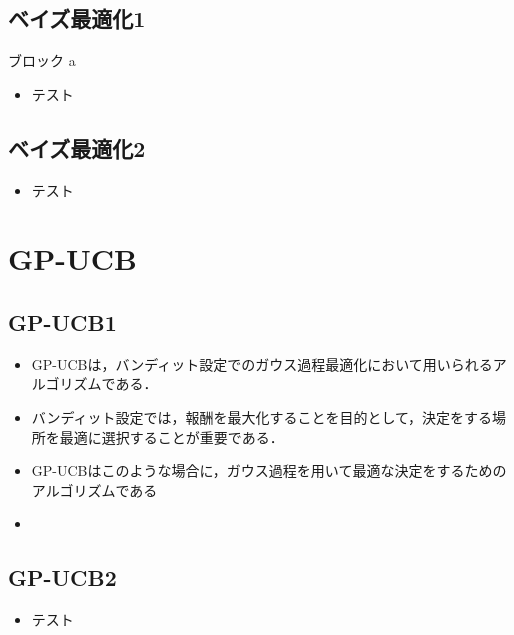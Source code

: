 \documentclass[dvipdfmx, 10.5pt]{beamer}
\begin{document}
\subsection{ベイズ最適化1}
\begin{frame}{\insertsubsection}
	\begin{block}{ブロック}
		a
	\end{block}
	\begin{itemize}
		\item テスト
	\end{itemize}
\end{frame}

\subsection{ベイズ最適化2}
\begin{frame}{\insertsubsection}
	\begin{itemize}
		\item テスト
	\end{itemize}

\end{frame}


\section{GP-UCB}

\subsection{GP-UCB1}

\begin{frame}{\insertsubsection}
	\begin{itemize}
		\item GP-UCBは，バンディット設定でのガウス過程最適化において用いられるアルゴリズムである．
		\item バンディット設定では，報酬を最大化することを目的として，決定をする場所を最適に選択することが重要である．
		\item GP-UCBはこのような場合に，ガウス過程を用いて最適な決定をするためのアルゴリズムである
		\item 
	\end{itemize}

\end{frame}

\subsection{GP-UCB2}
\begin{frame}{\insertsubsection}
	\begin{itemize}
		\item テスト
	\end{itemize}

\end{frame}
\end{document}
